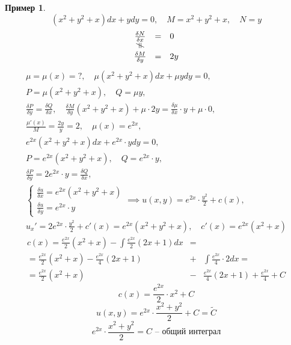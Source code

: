 \documentclass[11pt,a4paper,oneside]{report}
\newcommand{\vertneq}[0]{\rotatebox{90}{$\ne$}}
\theoremstyle{definition}
\newtheorem{example}{Пример}
\theoremstyle{plain}
\theoremstyle{remark}
\begin{document}
\begin{example}
    \begin{equation*}
        (x^2 + y^2 + x)dx + ydy = 0, \quad M = x^2 + y^2 + x, \quad N = y
    \end{equation*}
    \begin{equation*}
        \begin{array}{ccl}
            \frac{\delta N}{\delta x} & = & 0  \\
            \vertneq                  &   &    \\
            \frac{\delta M}{\delta y} & = & 2y
        \end{array}
    \end{equation*}
    \begin{multline*}
        \mu = \mu(x) = ?, \quad \mu(x^2 + y^2 + x)dx + \mu y dy = 0, \\
        P = \mu(x^2 + y^2 + x), \quad Q = \mu y, \\
        \frac{\delta P}{\delta y} = \frac{\delta Q}{\delta x}, \quad \frac{\delta M}{\delta y}(x^2 + y^2 + x) + \mu \cdot 2y = \frac{\delta \mu}{\delta x} \cdot y + \mu \cdot 0, \\
        \frac{\mu'(x)}{M} = \frac{2y}{y} = 2, \quad \mu(x) = e^{2x}, \\
        e^{2x}(x^2 + y^2 + x) dx + e^{2x} \cdot y dy = 0, \\
        P = e^{2x}(x^2 + y^2 + x), \quad Q = e^{2x}\cdot y, \\
        \frac{\delta P}{\delta y} = 2e^{2x} \cdot y = \frac{\delta Q}{\delta x}, \\
        \left\{\begin{array}{l}
            \frac{\delta u}{\delta x} = e^{2x}(x^2 + y^2 + x) \\
            \frac{\delta u}{\delta y} = e^{2x}\cdot y
        \end{array}\right. \implies u(x,y) = e^{2x} \cdot \frac{y^2}{2} + c(x), \\
        u_x' = 2e^{2x} \cdot \frac{y^2}{2} + c'(x) = e^{2x}(x^2 + y^2 + x), \quad c'(x) = e^{2x}(x^2 + x)
    \end{multline*}
    \begin{eqnarray*}
        c(x) = \frac{e^{2x}}{2}(x^2 + x) - \int \frac{e^{2x}}{2}(2x + 1)dx & = & \\
        = \frac{e^{2x}}{2}(x^2 + x) - \frac{e^{2x}}{4}(2x + 1) &+& \int \frac{e^{2x}}{4}\cdot 2 dx = \\
        = \frac{e^{2x}}{2}(x^2 + x) &-& \frac{e^{2x}}{4}(2x+1) + \frac{e^{2x}}{4} + C
    \end{eqnarray*}
    \begin{equation*}
        c(x) = \frac{e^{2x}}{2}\cdot x^2 + C
    \end{equation*}
    \begin{equation*}
        u(x,y) = e^{2x} \cdot \frac{x^2 + y^2}{2} + C = \widetilde{C}
    \end{equation*}
    \begin{equation*}
        e^{2x} \cdot \frac{x^2 + y^2}{2} = C\text{ -- общий интеграл}
    \end{equation*}
\end{example}
\end{document}
